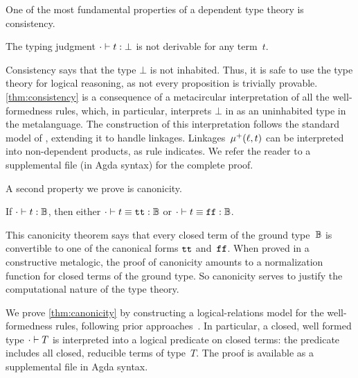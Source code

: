 One of the most fundamental properties of a dependent type theory is consistency.
\begin{theorem}[Consistency]
\label{thm:consistency}
  The typing judgment $ {\cdot} \vdash {t} : {\bot} $ is not derivable for any term~$t$.
\end{theorem}

\noindent
Consistency says that the type $\bot$ is not inhabited.
Thus, it is safe to use the type theory for logical reasoning, as not
every proposition is trivially provable.
\cref{thm:consistency} is a consequence of a meta\-circular interpretation of all
the well-formedness rules, which, in particular, interprets $\bot$ in
\TT as an uninhabited type in the meta\-language.
The construction of this interpretation follows the standard model of
\citet{altkap2016}, extending it to handle linkages.
Linkages~$\mu^+({\ell},{t})$ can be interpreted into non-dependent products,
as rule  indicates.
%
We refer the reader to a supplemental file (in Agda syntax) for the complete proof.


A second property we prove is canonicity.

\begin{theorem}[Canonicity]
\label{thm:canonicity}
  If $ {\cdot} \vdash {t} : {\mathbb{B}} $, then either $ {\cdot} \vdash {t \equiv \ensuremath{\texttt{tt}}} : {\mathbb{B}} $ or $ {\cdot} \vdash {t \equiv \ensuremath{\texttt{ff}}} : {\mathbb{B}} $.
\end{theorem}

\noindent
This canonicity theorem says that every closed term of the ground
type~$\mathbb{B}$ is convertible to one of the canonical forms $\texttt{tt}$ and~$\texttt{ff}$.
When proved in a constructive meta\-logic, the proof of canonicity
amounts to a normalization function for closed terms of the ground type.
So canonicity serves to justify the computational nature of the type theory.

We prove \cref{thm:canonicity} by constructing a logical-relations model
for the well-formedness rules, following prior approaches~\cite{coquand2018canonicity,sterling2019algebraic,kaposi2019gluing}.
In particular, a closed, well formed type $ {\cdot} \vdash {T} $ is interpreted
into a logical predicate on closed terms: the predicate includes all
closed, reducible terms of type~$T$.
The proof is available as a supplemental file in Agda syntax.